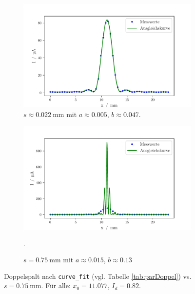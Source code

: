 \begin{figure}
    \centering
    \begin{subfigure}{.5\textwidth}
        \centering
        \includegraphics[width=.7\textwidth]{python/DoppelspaltFit.pdf}
        \caption{$s \approx \SI{0.022}{\milli\meter}$ mit $a \approx 0.005$, $b \approx 0.047$.}
        \label{fig:lsd3ss}
    \end{subfigure}%
    \begin{subfigure}{.5\textwidth}
        \centering
        \includegraphics[width=.7\linewidth]{python/DoppelspaltFits.pdf}
        \caption{$s = \SI{0.75}{\milli\meter}$ mit $a \approx 0.015$, $b \approx 0.13$}.
        \label{fig:lsd3s}
    \end{subfigure}
    \caption{Doppelspalt nach \texttt{curve\_fit} (vgl. Tabelle \ref{tab:parDoppel}) vs. $s = \SI{0.75}{\milli\meter}$. Für alle: $x_0 = 11.077$, $I_d = 0.82$.}
        \label{fig:ggn1}
    \end{figure}

